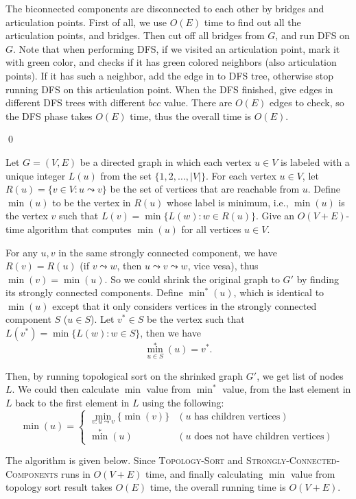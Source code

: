\begin{description}
The biconnected components are disconnected to each other by bridges and articulation points. First of all, we use $O(E)$ time to find out all the articulation points, and bridges.
Then cut off all bridges from $G$, and run DFS on $G$. Note that when performing DFS, if we visited an articulation point, mark it with green color, and checks if it has green colored
neighbors (also articulation points). If it has such a neighbor, add the edge in to DFS tree, otherwise stop running DFS on this articulation point. When the DFS finished, give edges in
different DFS trees with different $bcc$ value. There are $O(E)$ edges to check, so the DFS phase takes $O(E)$ time, thus the overall time is $O(E)$.
\end{description}
\qed

Let $G=(V, E)$ be a directed graph in which each vertex $u\in V$ is labeled with a unique integer $L(u)$ from the set $\{1, 2, \ldots, |V|\}$. For each vertex $u\in V$, let
$R(u) = \{v\in V: u\leadsto v\}$ be the set of vertices that are reachable from $u$. Define $\min(u)$ to be the vertex in $R(u)$ whose label is minimum, i.e., $\min(u)$ is
the vertex $v$ such that $L(v) = \min\{L(w):w\in R(u)\}$. Give an $O(V + E)$-time algorithm that computes $\min(u)$ for all vertices $u\in V$.

\answer
For any $u, v$ in the same strongly connected component, we have $R(v)=R(u)$ (if $v \leadsto w$, then $u \leadsto v \leadsto w$, vice vesa), thus $\min(v)=\min(u)$. So we could
shrink the original graph to $G'$ by finding its strongly connected components. Define $\min^*(u)$, which is identical to $\min(u)$ except that it only considers vertices in
the strongly connected component $S$ ($u \in S$).
Let $v^*\in S$ be the vertex such that $L(v^*) = \min\{L(w):w\in S\}$, then we have
$$\min_{u\in S}^*(u) = v^*.$$

Then, by running topological sort on the shrinked graph $G'$, we get list of nodes $L$. We could then calculate $\min$ value from $\min^*$ value, from the last element in $L$ back
to the first element in $L$ using the following:
$$\min(u) = \left\{\begin{array}{ll}
\min_{v : u \leadsto v}\{\min(v)\} & (u \text{ has children vertices})\\
\min^*(u) & (u \text{ does not have children vertices})
\end{array}\right.
$$

The algorithm is given below. Since \textsc{Topology-Sort} and \textsc{Strongly-Connected-Components} runs in $O(V + E)$ time, and finally calculating $\min$ value from topology
sort result takes $O(E)$ time, the overall running time is $O(V + E)$.

